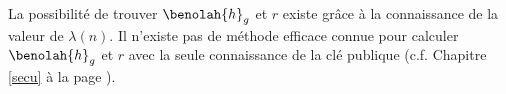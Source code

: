 	\begin{remark} La possibilité de trouver $\benolah{h}_g$ et $r$ existe grâce à la connaissance de la
	valeur de $\lambda(n)$. Il n'existe pas de méthode efficace connue pour calculer $\benolah{h}_g$ et $r$ 
	avec la seule connaissance de la clé publique  (c.f. Chapitre \ref{secu}
			à la page \pageref{secu}).
	\end{remark}
